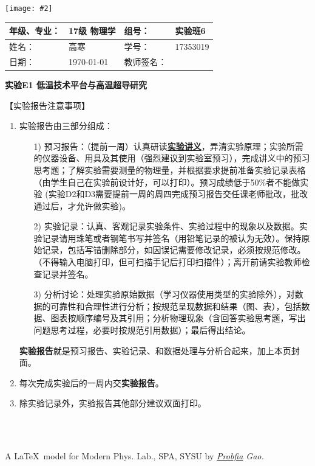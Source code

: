 \documentclass[11pt,a4paper]{ctexart}
\newcommand{\ExpeName}{实验E1 低温技术平台与高温超导研究}
\newcommand{\cpic}[2]{
\begin{center}
\texttt{[image: \#2]}
\end{center}
}
\begin{document}
\cpic{0.255}{e1}%
\begin{table}[H]
\centering
\begin{tabular}{|p{32mm}|p{32mm}|p{32mm}|p{32mm}|}
\hline
年级、专业： & 17级 物理学 & 组号： & 实验班6 \\ \hline
姓名： & 高寒 & 学号： & 17353019 \\ \hline
日期： & \today & 教师签名： &  \\ \hline
\end{tabular}
\end{table}
\begin{center}
\LARGE\textbf{{\ExpeName}}
\end{center}
\large{【实验报告注意事项】}
\begin{enumerate}
 \item 实验报告由三部分组成：
 \begin{enumerate}
  \item[1)]预习报告：（提前一周）认真研读\textbf{\uline{实验讲义}}，弄清实验原理；实验所需的仪器设备、用具及其使用（强烈建议到实验室预习），完成讲义中的预习思考题；了解实验需要测量的物理量，并根据要求提前准备实验记录表格（由学生自己在实验前设计好，可以打印）。预习成绩低于50\%者不能做实验{\color{red} (实验D2和D3需要提前一周的周四完成预习报告交任课老师批改，批改通过后，才允许做实验)}。

  \item[2)]实验记录：认真、客观记录实验条件、实验过程中的现象以及数据。实验记录请用珠笔或者钢笔书写并签名（{\color{red}用铅笔记录的被认为无效}）。{\color{red}保持原始记录，包括写错删除部分，如因误记需要修改记录，必须按规范修改。}（不得输入电脑打印，但可扫描手记后打印扫描件）；离开前请实验教师检查记录并签名。
  \item[3)]分析讨论：处理实验原始数据（学习仪器使用类型的实验除外），对数据的可靠性和合理性进行分析；按规范呈现数据和结果（图、表），包括数据、图表按顺序编号及其引用；分析物理现象（含回答实验思考题，写出问题思考过程，必要时按规范引用数据）；最后得出结论。
 \end{enumerate}
 \textbf{实验报告}就是预习报告、实验记录、和数据处理与分析合起来，加上本页封面。
 \item 每次完成实验后的一周内交\textbf{实验报告}。
 \item 除实验记录外，实验报告其他部分建议双面打印。
\end{enumerate}
\ 
\\
\ 

\begin{flushright}                                                           %
\tiny{
A \LaTeX \ model for Modern Phys. Lab., SPA, SYSU by \em{\href{https://www.weibo.com/3532532974/profile?rightmod=1&wvr=6&mod=personinfo&is_all=1}{Probfia} Gao.}
}
\end{flushright}
\end{document}
